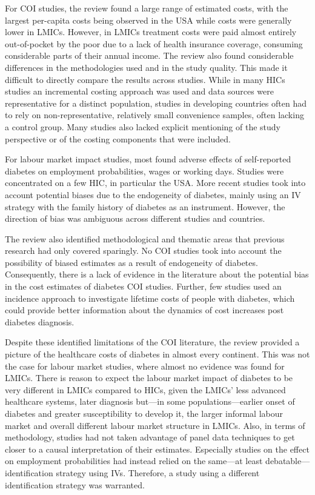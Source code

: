 For \ac{COI} studies, the review found a large range of estimated costs, with the largest per-capita costs being observed in the USA while costs were generally lower in \acp{LMIC}. However, in \acp{LMIC} treatment costs were paid almost entirely out-of-pocket by the poor due to a lack of health insurance coverage, consuming considerable parts of their annual income.  The review also found considerable differences in the methodologies used and in the study quality. This made it difficult to directly compare the results across studies. While in many \acp{HIC} studies an incremental costing approach was used and data sources were representative for a distinct population, studies in developing countries often had to rely on non-representative, relatively small convenience samples, often lacking a control group. Many studies also lacked explicit mentioning of the study perspective or of the costing components that were included. 

For labour market impact studies, most found adverse effects of self-reported diabetes on employment probabilities, wages or working days. Studies were concentrated on a few \ac{HIC}, in particular the USA. More recent studies took into account potential biases due to the endogeneity of diabetes, mainly using an \ac{IV} strategy with the family history of diabetes as an instrument. However, the direction of bias was ambiguous across different studies and countries. 

The review also identified methodological and thematic areas that previous research had only covered sparingly. No \ac{COI} studies took into account the possibility of biased estimates as a result of endogeneity of diabetes. Consequently, there is a lack of evidence in the literature about the potential bias in the cost estimates of diabetes \ac{COI} studies. Further, few studies used an incidence approach to investigate lifetime costs of people with diabetes, which could provide better information about the dynamics of cost increases post diabetes diagnosis. 

Despite these identified limitations of the \ac{COI} literature, the review provided a picture of the healthcare costs of diabetes in almost every continent. This was not the case for labour market studies, where almost no evidence was found for \acp{LMIC}. There is reason to expect the labour market impact of diabetes to be very different in \acp{LMIC} compared to \acp{HIC}, given the \acp{LMIC}' less advanced healthcare systems, later diagnosis but---in some populations---earlier onset of diabetes and greater susceptibility to develop it, the larger informal labour market and overall different labour market structure in \acp{LMIC}. Also, in terms of methodology, studies had not taken advantage of panel data techniques to get closer to a causal interpretation of their estimates. Especially studies on the effect on employment probabilities had instead relied on the same---at least debatable---identification strategy using \acp{IV}. Therefore, a study using a different identification strategy was warranted.

